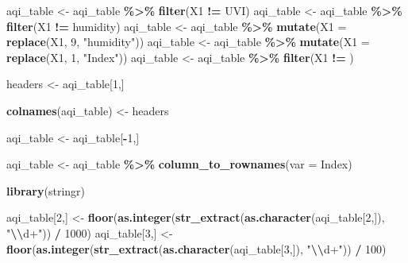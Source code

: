 \documentclass[
]{article}
\newenvironment{Shaded}{\begin{snugshade}}{\end{snugshade}}
\newcommand{\AttributeTok}[1]{\textcolor[rgb]{0.13,0.29,0.53}{#1}}
\newcommand{\DecValTok}[1]{\textcolor[rgb]{0.00,0.00,0.81}{#1}}
\newcommand{\FunctionTok}[1]{\textcolor[rgb]{0.13,0.29,0.53}{\textbf{#1}}}
\newcommand{\NormalTok}[1]{#1}
\newcommand{\OtherTok}[1]{\textcolor[rgb]{0.56,0.35,0.01}{#1}}
\newcommand{\SpecialCharTok}[1]{\textcolor[rgb]{0.81,0.36,0.00}{\textbf{#1}}}
\newcommand{\StringTok}[1]{\textcolor[rgb]{0.31,0.60,0.02}{#1}}
\begin{document}
\begin{Shaded}
\begin{Highlighting}[]
\NormalTok{aqi\_table }\OtherTok{\textless{}{-}}\NormalTok{ aqi\_table }\SpecialCharTok{\%\textgreater{}\%} \FunctionTok{filter}\NormalTok{(X1 }\SpecialCharTok{!=} \StringTok{\textquotesingle{}UVI\textquotesingle{}}\NormalTok{)}
\NormalTok{aqi\_table }\OtherTok{\textless{}{-}}\NormalTok{ aqi\_table }\SpecialCharTok{\%\textgreater{}\%} \FunctionTok{filter}\NormalTok{(X1 }\SpecialCharTok{!=} \StringTok{\textquotesingle{}humidity\textquotesingle{}}\NormalTok{)}
\NormalTok{aqi\_table }\OtherTok{\textless{}{-}}\NormalTok{ aqi\_table }\SpecialCharTok{\%\textgreater{}\%} \FunctionTok{mutate}\NormalTok{(}\AttributeTok{X1 =} \FunctionTok{replace}\NormalTok{(X1, }\DecValTok{9}\NormalTok{, }\StringTok{"humidity"}\NormalTok{))}
\NormalTok{aqi\_table }\OtherTok{\textless{}{-}}\NormalTok{ aqi\_table }\SpecialCharTok{\%\textgreater{}\%} \FunctionTok{mutate}\NormalTok{(}\AttributeTok{X1 =} \FunctionTok{replace}\NormalTok{(X1, }\DecValTok{1}\NormalTok{, }\StringTok{"Index"}\NormalTok{))}
\NormalTok{aqi\_table }\OtherTok{\textless{}{-}}\NormalTok{ aqi\_table }\SpecialCharTok{\%\textgreater{}\%} \FunctionTok{filter}\NormalTok{(X1 }\SpecialCharTok{!=} \StringTok{\textquotesingle{}\textquotesingle{}}\NormalTok{)}

\NormalTok{headers }\OtherTok{\textless{}{-}}\NormalTok{ aqi\_table[}\DecValTok{1}\NormalTok{,]}

\FunctionTok{colnames}\NormalTok{(aqi\_table) }\OtherTok{\textless{}{-}}\NormalTok{ headers}

\NormalTok{aqi\_table }\OtherTok{\textless{}{-}}\NormalTok{ aqi\_table[}\SpecialCharTok{{-}}\DecValTok{1}\NormalTok{,]}

\NormalTok{aqi\_table }\OtherTok{\textless{}{-}}\NormalTok{ aqi\_table }\SpecialCharTok{\%\textgreater{}\%} \FunctionTok{column\_to\_rownames}\NormalTok{(}\AttributeTok{var =} \StringTok{\textquotesingle{}Index\textquotesingle{}}\NormalTok{)}

\FunctionTok{library}\NormalTok{(stringr)}

\NormalTok{aqi\_table[}\DecValTok{2}\NormalTok{,] }\OtherTok{\textless{}{-}} \FunctionTok{floor}\NormalTok{(}\FunctionTok{as.integer}\NormalTok{(}\FunctionTok{str\_extract}\NormalTok{(}\FunctionTok{as.character}\NormalTok{(aqi\_table[}\DecValTok{2}\NormalTok{,]), }\StringTok{"}\SpecialCharTok{\textbackslash{}\textbackslash{}}\StringTok{d+"}\NormalTok{)) }\SpecialCharTok{/} \DecValTok{1000}\NormalTok{)}
\NormalTok{aqi\_table[}\DecValTok{3}\NormalTok{,] }\OtherTok{\textless{}{-}} \FunctionTok{floor}\NormalTok{(}\FunctionTok{as.integer}\NormalTok{(}\FunctionTok{str\_extract}\NormalTok{(}\FunctionTok{as.character}\NormalTok{(aqi\_table[}\DecValTok{3}\NormalTok{,]), }\StringTok{"}\SpecialCharTok{\textbackslash{}\textbackslash{}}\StringTok{d+"}\NormalTok{)) }\SpecialCharTok{/} \DecValTok{100}\NormalTok{)}


\end{Highlighting}
\end{Shaded}
\end{document}
